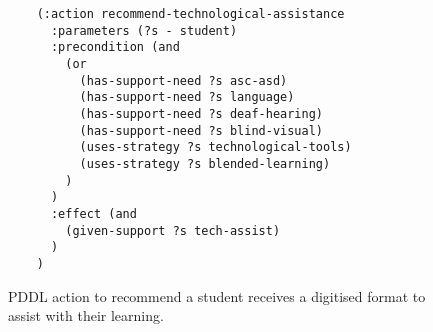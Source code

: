 \begin{figure}[t]
    \begin{lstlisting}
    (:action recommend-technological-assistance
      :parameters (?s - student)
      :precondition (and 
        (or
          (has-support-need ?s asc-asd)
          (has-support-need ?s language)
          (has-support-need ?s deaf-hearing)
          (has-support-need ?s blind-visual)
          (uses-strategy ?s technological-tools)
          (uses-strategy ?s blended-learning)
        )
      )
      :effect (and 
        (given-support ?s tech-assist)
      )
    )
    \end{lstlisting}
    \caption{PDDL action to recommend a student receives a digitised format to assist with their learning.}\label{fig:pddl-action-tech-assist}
\end{figure}